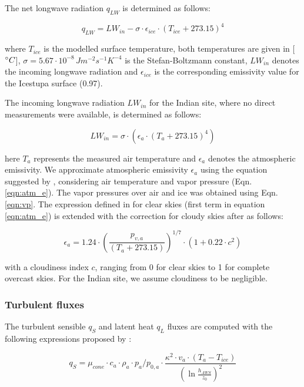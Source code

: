 \documentclass[utf8]{frontiersSCNS}
\begin{document}
The net longwave radiation $q_{LW}$ is determined as follows:

\begin{equation}
	q_{LW}= LW_{in}-\sigma \cdot \epsilon_{ice} \cdot {(T_{ice}+ 273.15)}^4
	\label{eqn:LW}
\end{equation}

where $T_{ice}$ is the modelled surface temperature, both temperatures are given in [$\degree C$],
$\sigma=5.67\cdot10^{-8}\,Jm^{-2}s^{-1}K^{-4}$ is the Stefan-Boltzmann constant, $LW_{in}$ denotes the incoming
longwave radiation and $\epsilon_{ice}$ is the corresponding emissivity value for the Icestupa surface (0.97).

The incoming longwave radiation $LW_{in}$ for the Indian site, where no direct measurements were available, is
determined as follows:

\begin{equation}
	LW_{in}=\sigma \cdot (\epsilon_a \cdot {(T_a+ 273.15)}^4)
	\label{eqn:LWin}
\end{equation}

here $T_a$ represents the measured air temperature and $\epsilon_a$ denotes the atmospheric emissivity. We
approximate atmospheric emissivity $\epsilon_a$ using the equation suggested by \cite{Brutsaert_1982},
considering air temperature and vapor pressure (Eqn.  \ref{eqn:atm_e}). The vapor pressures over air and ice was
obtained using Eqn. \ref{eqn:vp}.  The expression defined in \cite{Brutsaert_1975} for clear skies (first term
in equation \ref{eqn:atm_e}) is extended with the correction for cloudy skies after \cite{Brutsaert_1982} as
follows:

\begin{equation}
	\epsilon_a=1.24 \cdot (\frac{p_{v,a}}{(T_a+273.15)})^{1/7}\cdot(1+0.22\cdot{c}^2) \label{eqn:atm_e}
\end{equation}

with a cloudiness index $c$, ranging from 0 for clear skies to 1 for complete overcast skies. For the Indian
site, we assume cloudiness to be negligible.

\subsubsection{Turbulent fluxes}

The turbulent sensible $q_{S}$ and latent heat $q_{L}$ fluxes are computed with the following expressions
proposed by \cite{Garratt_1992}:

\begin{equation}
	q_{S}=\mu_{cone}\cdot c_{a} \cdot \rho_{a} \cdot p_{a}/p_{0,a} \cdot \frac{\kappa^2 \cdot v_a \cdot
		(T_a-T_{ice})}{{(\ln{\frac{h_{AWS}}{z_{0}}})}^2}
	\label{eqn:qs}
\end{equation}
\end{document}
